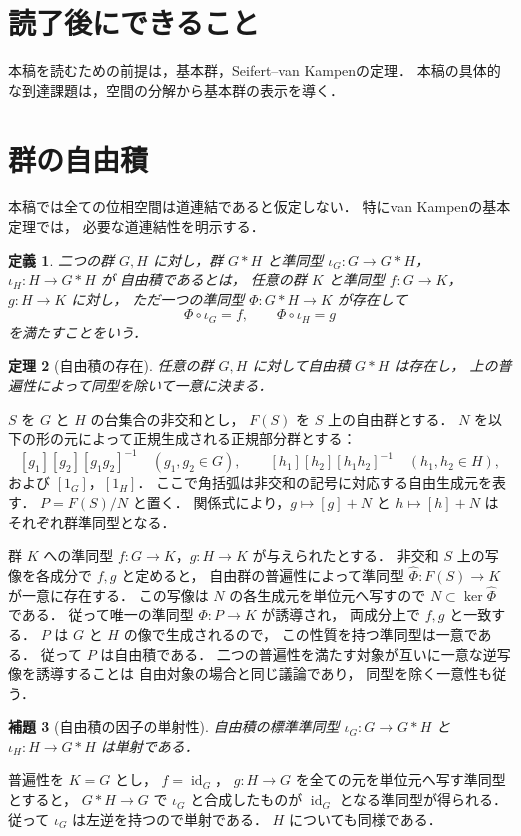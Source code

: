 \documentclass[a5paper,10pt,onecolumn]{jsarticle}
\makeatletter
\theoremstyle{mathnotetheorem}
\newtheorem{theorem}{定理}[section]
\newtheorem{definition}[theorem]{定義}
\newtheorem{lemma}[theorem]{補題}
\renewcommand{\proofname}{証明}
\renewenvironment{proof}[1][\proofname]{%
  \par\pushQED{\qed}\normalfont\topsep4\p@\@plus2\p@\relax
  \trivlist\item[\hskip\labelsep\bfseries #1]\ignorespaces
}{\popQED\endtrivlist\@endpefalse}
\makeatother
\begin{document}
\section*{読了後にできること}
本稿を読むための前提は，基本群，Seifert--van Kampenの定理．
本稿の具体的な到達課題は，空間の分解から基本群の表示を導く．

\section{群の自由積}

本稿では全ての位相空間は道連結であると仮定しない．
特にvan Kampenの基本定理では，
必要な道連結性を明示する．

\begin{definition}
二つの群 $G,H$ に対し，群 $G*H$ と準同型
$\iota_G:G\to G*H$，$\iota_H:H\to G*H$ が
\emph{自由積}であるとは，
任意の群 $K$ と準同型
$f:G\to K$，$g:H\to K$ に対し，
ただ一つの準同型
$\Phi:G*H\to K$ が存在して
\[
 \Phi\circ\iota_G=f,\qquad
 \Phi\circ\iota_H=g
\]
を満たすことをいう．
\end{definition}

\begin{theorem}[自由積の存在]\label{thm:free-product}
任意の群 $G,H$ に対して自由積 $G*H$ は存在し，
上の普遍性によって同型を除いて一意に決まる．
\end{theorem}
\begin{proof}
$S$ を $G$ と $H$ の台集合の非交和とし，
$F(S)$ を $S$ 上の自由群とする．
$N$ を以下の形の元によって正規生成される正規部分群とする：
\[
 [g_1][g_2][g_1g_2]^{-1}\quad(g_1,g_2\in G),
 \qquad
 [h_1][h_2][h_1h_2]^{-1}\quad(h_1,h_2\in H),
\]
および $[1_G]$，$[1_H]$．
ここで角括弧は非交和の記号に対応する自由生成元を表す．
$P=F(S)/N$ と置く．
関係式により，$g\mapsto[g]+N$ と
$h\mapsto[h]+N$ はそれぞれ群準同型となる．

群 $K$ への準同型 $f:G\to K$，$g:H\to K$ が与えられたとする．
非交和 $S$ 上の写像を各成分で $f,g$ と定めると，
自由群の普遍性によって準同型
$\widehat\Phi:F(S)\to K$ が一意に存在する．
この写像は $N$ の各生成元を単位元へ写すので
$N\subset\ker\widehat\Phi$ である．
従って唯一の準同型 $\Phi:P\to K$ が誘導され，
両成分上で $f,g$ と一致する．
$P$ は $G$ と $H$ の像で生成されるので，
この性質を持つ準同型は一意である．
従って $P$ は自由積である．
二つの普遍性を満たす対象が互いに一意な逆写像を誘導することは
自由対象の場合と同じ議論であり，
同型を除く一意性も従う．
\end{proof}

\begin{lemma}[自由積の因子の単射性]\label{lem:free-product-injection}
自由積の標準準同型
$\iota_G:G\to G*H$ と
$\iota_H:H\to G*H$ は単射である．
\end{lemma}
\begin{proof}
普遍性を $K=G$ とし，
$f=\operatorname{id}_G$，
$g:H\to G$ を全ての元を単位元へ写す準同型とすると，
$G*H\to G$ で $\iota_G$ と合成したものが
$\operatorname{id}_G$ となる準同型が得られる．
従って $\iota_G$ は左逆を持つので単射である．
$H$ についても同様である．
\end{proof}
\end{document}
